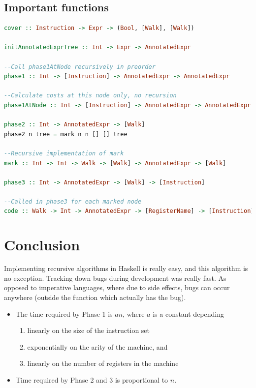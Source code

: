 \documentclass{article}
\begin{document}
\subsection{Important functions}

\begin{lstlisting}[language=Haskell]
cover :: Instruction -> Expr -> (Bool, [Walk], [Walk])

initAnnotatedExprTree :: Int -> Expr -> AnnotatedExpr

--Call phase1AtNode recursively in preorder
phase1 :: Int -> [Instruction] -> AnnotatedExpr -> AnnotatedExpr

--Calculate costs at this node only, no recursion
phase1AtNode :: Int -> [Instruction] -> AnnotatedExpr -> AnnotatedExpr

phase2 :: Int -> AnnotatedExpr -> [Walk]
phase2 n tree = mark n n [] [] tree

--Recursive implementation of mark
mark :: Int -> Int -> Walk -> [Walk] -> AnnotatedExpr -> [Walk]

phase3 :: Int -> AnnotatedExpr -> [Walk] -> [Instruction]

--Called in phase3 for each marked node
code :: Walk -> Int -> AnnotatedExpr -> [RegisterName] -> [Instruction] -> (RegisterName, [Instruction], [RegisterName])
\end{lstlisting}

\section{Conclusion}
Implementing recursive algorithms in Haskell is really easy, and this algorithm is no exception. Tracking down bugs during development was really fast. As opposed to imperative languages, where due to side effects, bugs can occur anywhere (outside the function which actually has the bug).

\begin{itemize}
\item 
The time required by Phase 1 is $an$, where $a$ is a constant depending
\begin{enumerate}
\item linearly on the size of the instruction set
\item exponentially on the arity of the machine, and
\item linearly on the number of registers in the machine
\end{enumerate}
\item Time required by Phase 2 and 3 is proportional to $n$.
\end{itemize}




\end{document}
